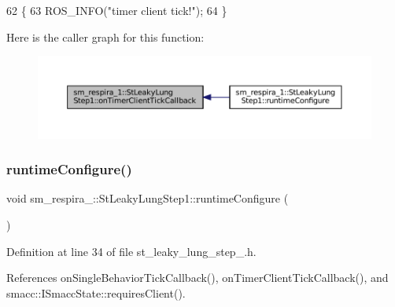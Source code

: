 \begin{DoxyCode}
62     \{
63         ROS\_INFO(\textcolor{stringliteral}{"timer client tick!"});
64     \}
\end{DoxyCode}
Here is the caller graph for this function\+:
\nopagebreak
\begin{figure}[H]
\begin{center}
\leavevmode
\includegraphics[width=350pt]{structsm__respira__1_1_1StLeakyLungStep1_a1b9954b4c7d47fe9423dd29391f5629b_icgraph}
\end{center}
\end{figure}
\mbox{\label{structsm__respira__1_1_1StLeakyLungStep1_a719c4ddb79e1709beb87e4e124104723}} 
\subsubsection{\texorpdfstring{runtime\+Configure()}{runtimeConfigure()}}
{\footnotesize\ttfamily void sm\+\_\+respira\+\_\+::\+St\+Leaky\+Lung\+Step1\+::runtime\+Configure (\begin{DoxyParamCaption}{ }\end{DoxyParamCaption})\hspace{0.3cm}{\ttfamily [inline]}}



Definition at line 34 of file st\+\_\+leaky\+\_\+lung\+\_\+step\+\_.\+h.



References on\+Single\+Behavior\+Tick\+Callback(), on\+Timer\+Client\+Tick\+Callback(), and smacc\+::\+I\+Smacc\+State\+::requires\+Client().


